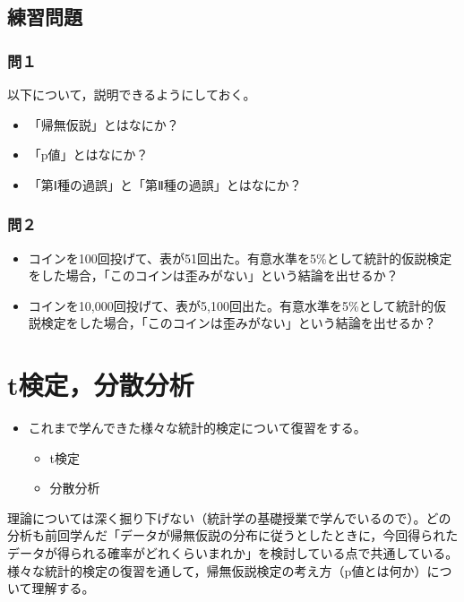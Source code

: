 \documentclass[]{article}
\providecommand{\tightlist}{%
  \setlength{\itemsep}{0pt}\setlength{\parskip}{0pt}}
\begin{document}
\subsection{練習問題}\label{-5}

\subsubsection{問１}\label{-10}

以下について，説明できるようにしておく。

\begin{itemize}
\tightlist
\item
  「帰無仮説」とはなにか？
\item
  「p値」とはなにか？
\item
  「第Ⅰ種の過誤」と「第Ⅱ種の過誤」とはなにか？
\end{itemize}

\subsubsection{問２}\label{-11}

\begin{itemize}
\item
  コインを100回投げて、表が51回出た。有意水準を5\%として統計的仮説検定をした場合，「このコインは歪みがない」という結論を出せるか？
\item
  コインを10,000回投げて、表が5,100回出た。有意水準を5\%として統計的仮説検定をした場合，「このコインは歪みがない」という結論を出せるか？
\end{itemize}

\section{t検定，分散分析}\label{t}

\begin{itemize}
\tightlist
\item
  これまで学んできた様々な統計的検定について復習をする。

  \begin{itemize}
  \tightlist
  \item
    t検定
  \item
    分散分析
  \end{itemize}
\end{itemize}

理論については深く掘り下げない（統計学の基礎授業で学んでいるので）。どの分析も前回学んだ「データが帰無仮説の分布に従うとしたときに，今回得られたデータが得られる確率がどれくらいまれか」を検討している点で共通している。様々な統計的検定の復習を通して，帰無仮説検定の考え方（p値とは何か）について理解する。
\end{document}
